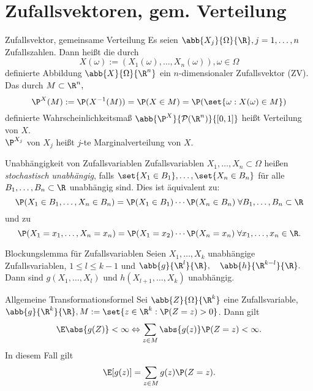 \section*{Zufallsvektoren, gem. Verteilung}

\begin{karte}{Zufallsvektor, gemeinsame Verteilung}
    Es seien \( \abb{X_j}{\Omega}{\R}, j = 1,\ldots,n \) Zufallszahlen. 
    Dann heißt die durch 
    \[ X(\omega) := (X_1(\omega), \ldots, X_n(\omega)), \omega \in \Omega \]
    definierte Abbildung \( \abb{X}{\Omega}{\R^n} \) ein \(n\)-dimensionaler 
    Zufallsvektor (ZV). 
    Das durch \( M \subset \R^n, \)
    \[ \P^X(M) := \P(X^{-1}(M)) = \P(X \in M) 
    = \P(\set{ \omega : X(\omega) \in M }) \]
    definierte Wahrscheinlichkeitsmaß 
    \( \abb{\P^X}{\mathcal{P}(\R^n)}{[0,1]} \) 
    heißt Verteilung von \(X\).\\
    \( \P^{X_j} \) von \(X_j\) heißt \(j\)-te Marginalverteilung von \(X\).
\end{karte}

\begin{karte}{Unabhängigkeit von Zufallsvariablen}
    Zufallsvariablen \( X_1, \ldots, X_n \subset \Omega \) 
    heißen \textit{stochastisch unabhängig}, falls 
    \( \set{X_1 \in B_1}, \ldots, \set{X_n \in B_n} \) 
    für alle \( B_1, \ldots, B_n \subset \R \) 
    unabhängig sind.
    Dies ist äquivalent zu:
    \[ \P(X_1 \in B_1,\ldots, X_n \in B_n) 
    = \P(X_1\in B_1) \cdots \P(X_n \in B_n) 
    \;\forall B_1,\ldots,B_n \subset\R \]
    und zu 
    \[ \P(X_1 = x_1, \ldots, X_n = x_n) 
    = \P(X_1 = x_2) \cdots \P(X_n = x_n) 
    \;\forall x_1,\ldots,x_n \in \R. \]
\end{karte}

\begin{karte}{Blockungslemma für Zufallsvariablen}
    Seien \( X_1,\ldots, X_k \) unabhängige Zufallsvariablen, 
    \( 1 \leq l \leq k - 1 \) und 
    \( \abb{g}{\R^l}{\R}, \quad \abb{h}{\R^{k-l}}{\R}. \)
    Dann sind \( g(X_1,\ldots,X_l) \) und \( h(X_{l+1}, \ldots, X_k) \) 
    unabhängig.
\end{karte}

\begin{karte}{Allgemeine Transformationsformel}
    Sei \( \abb{Z}{\Omega}{\R^k} \) eine Zufallsvariable, 
    \( \abb{g}{\R^k}{\R}, M := \set{ z \in \R^k : \P(Z = z) > 0 } \). 
    Dann gilt 
    \[ \E\abs{g(Z)} < \infty \Leftrightarrow \sum_{z\in M}\abs{g(z)}\P(Z = z) < \infty. \]
    In diesem Fall gilt 
    \[ \E[g(z)] = \sum_{z\in M} g(z) \P(Z = z). \]
\end{karte}

